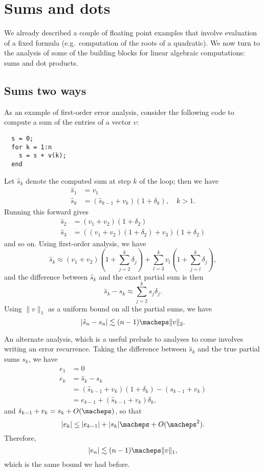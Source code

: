 \section{Sums and dots}

We already described a couple of floating point examples that
involve evaluation of a fixed formula (e.g.~computation of
the roots of a quadratic).  We now turn to the analysis of
some of the building blocks for linear algebraic computations:
sums and dot products.

\subsection{Sums two ways}

As an example of first-order error analysis, consider the following
code to compute a sum of the entries of a vector $v$:
\begin{lstlisting}
  s = 0;
  for k = 1:n
    s = s + v(k);
  end
\end{lstlisting}
Let $\hat{s}_k$ denote the computed sum at step $k$ of the loop;
then we have
\begin{align*}
  \hat{s}_1 &= v_1 \\
  \hat{s}_k &= (\hat{s}_{k-1} + v_k)(1 + \delta_k), \quad k > 1.
\end{align*}
Running this forward gives
\begin{align*}
  \hat{s}_2 &= (v_1 + v_2)(1+\delta_2) \\
  \hat{s}_3 &= ((v_1 + v_2)(1+\delta_2) + v_3)(1+\delta_2)
\end{align*}
and so on.  Using first-order analysis, we have
\[
  \hat{s}_k \approx (v_1 + v_2)\left(1 + \sum_{j=2}^k \delta_j \right)
              + \sum_{l=3}^k v_l \left( 1 + \sum_{j=l}^k \delta_j \right),
\]
and the difference between $\hat{s}_k$ and the exact partial sum
is then
\[
  \hat{s}_k-s_k \approx \sum_{j=2}^k s_j \delta_j.
\]
Using $\|v\|_1$ as a uniform bound on all the partial sums, we have
\[
  |\hat{s}_n-s_n| \lesssim (n-1) \macheps \|v\|_2.
\]

An alternate analysis, which is a useful prelude to analyses to come
involves writing an error recurrence.
Taking the difference between $\hat{s}_k$ and the true partial sums $s_k$,
we have
\begin{align*}
  e_1 &= 0 \\
  e_{k} &= \hat{s}_k-s_k \\
        &= (\hat{s}_{k-1} + v_k)(1+\delta_k) - (s_{k-1} + v_k) \\
        &= e_{k-1} + (\hat{s}_{k-1} + v_k) \delta_k,
\end{align*}
and $\hat{s}_{k-1} + v_k = s_k + O(\macheps)$, so that
\[
  |e_{k}| \leq |e_{k-1}| + |s_k| \macheps + O(\macheps^2).
\]
Therefore,
\[
  |e_{n}| \lesssim (n-1) \macheps \|v\|_1,
\]
which is the same bound we had before.

